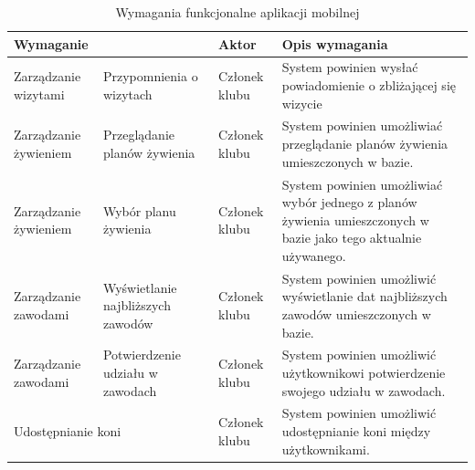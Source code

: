 \documentclass[12pt,twoside]{report}
\begin{document}
\begin{table}[h!]
	\centering
	\begin{tabular}{|p{3cm}|p{3cm}|p{4cm}|p{6cm}|}			
		\hline
		\multicolumn{2}{|l|}{Wymaganie} & Aktor & Opis wymagania\\
		\hline
		Zarządzanie wizytami & Przypomnienia o wizytach& Członek klubu & System powinien wysłać powiadomienie o zbliżającej się wizycie\\
		\hline
		Zarządzanie żywieniem & Przeglądanie planów żywienia & Członek klubu & System powinien umożliwiać przeglądanie planów żywienia umieszczonych w bazie.\\
		\hline
		Zarządzanie żywieniem & Wybór planu żywienia & Członek klubu & System powinien umożliwiać wybór jednego z planów żywienia umieszczonych w bazie jako tego aktualnie używanego.\\
		\hline
		Zarządzanie zawodami & Wyświetlanie najbliższych zawodów & Członek klubu & System powinien umożliwić wyświetlanie dat najbliższych zawodów umieszczonych w bazie.\\
		\hline
		Zarządzanie zawodami & Potwierdzenie udziału w zawodach & Członek klubu & System powinien umożliwić użytkownikowi potwierdzenie swojego udziału w zawodach.\\
		\hline
		\multicolumn{2}{|l|}{Udostępnianie koni}&Członek klubu& System powinien umożliwić udostępnianie koni między użytkownikami.\\
		\hline
	\end{tabular}
	\caption{Wymagania funkcjonalne aplikacji mobilnej}
	\label{funkcjonalneMobilki2}
\end{table}
\end{document}
